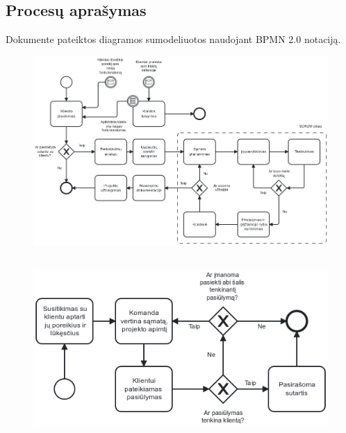 



\begin{landscape}
\section{Procesų aprašymas}
Dokumente pateiktos diagramos sumodeliuotos naudojant BPMN 2.0 notaciją.
\thispagestyle{empty}
\begin{figure}[H]%
    \centering
    \includegraphics[width=0.85\linewidth]{task-1/etc/diagrams/processes.png}
\end{figure}
\end{landscape}

\subsection{} %

\begin{figure}[H]%
    \centering
    \includegraphics[width=0.75\linewidth]{task-1/etc/diagrams/engage-client.png}
\end{figure}


